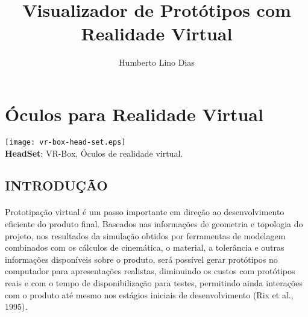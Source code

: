 \documentclass[12pt,a4paper]{article}
\title{Visualizador de Protótipos com Realidade Virtual}
\author{Humberto Lino Dias}
\begin{document}
\maketitle


\singlespacing
 
 
\section{Óculos para Realidade Virtual}

\begin{center}

\texttt{[image: vr-box-head-set.eps]} \\ [1em]
\textbf{HeadSet}: VR-Box, Óculos de realidade virtual.\cite{vr_vbox_head_set}

\end{center}

 
\subsection{INTRODUÇÃO}

\paragraph{}
Prototipação virtual é um passo importante em direção
ao desenvolvimento eficiente do produto final.
Baseados nas informações de geometria e topologia do
projeto, nos resultados da simulação obtidos por
ferramentas de modelagem combinados com os cálculos
de cinemática, o material, a tolerância e outras
informações disponíveis sobre o produto, será possível
gerar protótipos no computador para apresentações
realistas, diminuindo os custos com protótipos reais e
com o tempo de disponibilização para testes, permitindo
ainda interações com o produto até mesmo nos estágios
iniciais de desenvolvimento (Rix et al., 1995).
\end{document}
